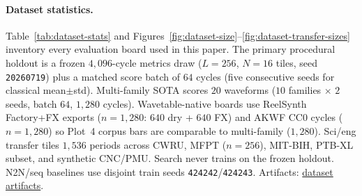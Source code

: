 \paragraph{Dataset statistics.}
Table~\ref{tab:dataset-stats} and Figures~\ref{fig:dataset-size}--\ref{fig:dataset-transfer-sizes} inventory every evaluation board used in this paper.
The primary procedural holdout is a frozen $4{,}096$-cycle metrics draw ($L{=}256$, $N{=}16$ tiles, seed \texttt{20260719}) plus a matched score batch of $64$ cycles (five consecutive seeds for classical mean$\pm$std).
Multi-family SOTA scores $20$ waveforms ($10$ families $\times$ $2$ seeds, batch $64$, $1{,}280$ cycles).
Wavetable-native boards use ReelSynth Factory+FX exports ($n{=}1{,}280$: $640$ dry + $640$ FX) and AKWF CC0 cycles ($n{=}1{,}280$) so Plot~4 corpus bars are comparable to multi-family ($1{,}280$).
Sci/eng transfer tiles $1{,}536$ periods across CWRU, MFPT ($n{=}256$), MIT-BIH, PTB-XL subset, and synthetic CNC/PMU.
Search never trains on the frozen holdout. N2N/seq baselines use disjoint train seeds \texttt{424242}/\texttt{424243}.
Artifacts: \href{https://github.com/reeldemo/denoise-opt-meta/tree/master/paper/Unsupervised_Wrap-Discontinuity_Repair_in_Wavetable_Synthesis_via_Hybrid_GA-PPO_Meta-Search_v14/figures}{dataset artifacts}.

